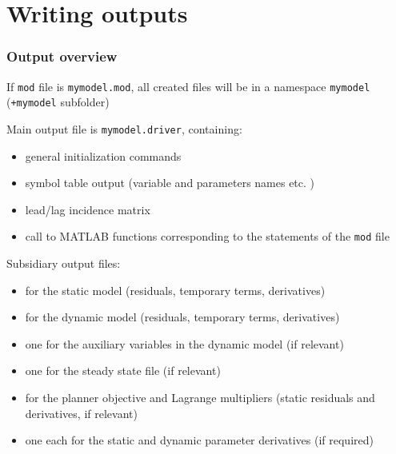\documentclass[handout,usepdftitle=false,xcolor=dvipsnames,aspectratio=169]{beamer}
\begin{document}
\section{Writing outputs}

\begin{frame}
  \frametitle{Output overview}
  \begin{witemize}
  \item If \texttt{mod} file is \texttt{mymodel.mod}, all created files will be in a namespace \texttt{mymodel} (\texttt{+mymodel} subfolder)
  \item Main output file is \texttt{mymodel.driver}, containing:
    \begin{itemize}
    \item general initialization commands
    \item symbol table output (variable and parameters names etc. )
    \item lead/lag incidence matrix
    \item call to MATLAB functions corresponding to the statements of the \texttt{mod} file
    \end{itemize}
  \item Subsidiary output files:
    \begin{itemize}
    \item for the static model (residuals, temporary terms, derivatives)
    \item for the dynamic model (residuals, temporary terms, derivatives)
    \item one for the auxiliary variables in the dynamic model (if relevant)
    \item one for the steady state file (if relevant)
    \item for the planner objective and Lagrange multipliers (static residuals and derivatives, if relevant)
    \item one each for the static and dynamic parameter derivatives (if required)
    \end{itemize}
  \end{witemize}
\end{frame}
\end{document}
